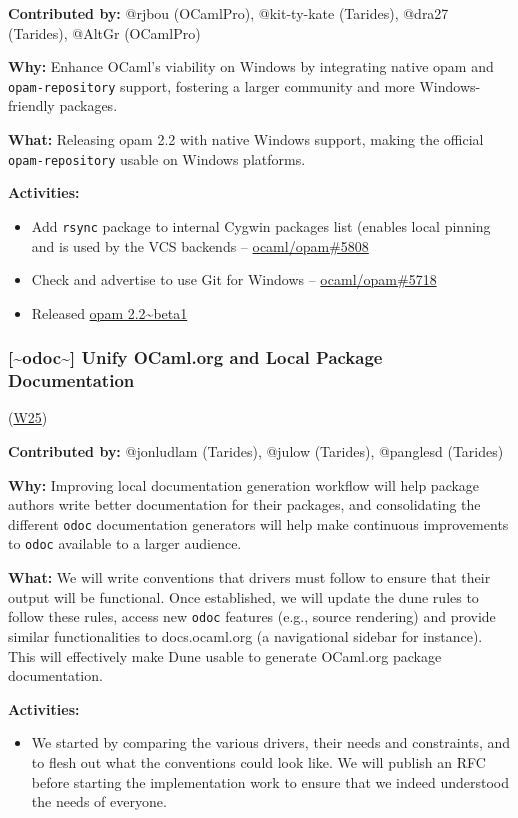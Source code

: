 \documentclass[11pt]{article}
\begin{document}
\textbf{Contributed by:} @rjbou (OCamlPro), @kit-ty-kate (Tarides), @dra27 (Tarides), @AltGr (OCamlPro)

\textbf{Why:} Enhance OCaml's viability on Windows by integrating native opam and \texttt{opam-repository} support, fostering a larger community
and more Windows-friendly packages.

\textbf{What:} Releasing opam 2.2 with native Windows support, making the official \texttt{opam-repository} usable on Windows platforms.

\textbf{Activities:}
\begin{itemize}
\item Add \texttt{rsync} package to internal Cygwin packages list (enables local pinning and is used by the VCS backends -- \href{https://github.com/ocaml/opam/pull/5808}{ocaml/opam\#5808}
\item Check and advertise to use Git for Windows -- \href{https://github.com/ocaml/opam/pull/5718}{ocaml/opam\#5718}
\item Released \href{https://ocaml.org/changelog/2024-01-18-opam-2-2-0-beta1}{opam 2.2\textasciitilde{}beta1}
\end{itemize}
\subsubsection*{\textbf{{[}\textasciitilde{}odoc\textasciitilde{}]} Unify OCaml.org and Local Package Documentation}
\label{sec:orgf3402ff}
(\href{https://ocaml.org/docs/platform-roadmap\#w25-generate-documentation}{W25})

\textbf{Contributed by:} @jonludlam (Tarides), @julow (Tarides), @panglesd (Tarides)

\textbf{Why:} Improving local documentation generation workflow will help package authors write better documentation for their packages,
and consolidating the different \texttt{odoc} documentation generators will help make continuous improvements to \texttt{odoc} available to a
larger audience.

\textbf{What:} We will write conventions that drivers must follow to ensure that their output will be functional. Once established, we
will update the dune rules to follow these rules, access new \texttt{odoc} features (e.g., source rendering) and provide similar
functionalities to docs.ocaml.org (a navigational sidebar for instance). This will effectively make Dune usable to generate OCaml.org
package documentation.

\textbf{Activities:}
\begin{itemize}
\item We started by comparing the various drivers, their needs and constraints, and to flesh out what the conventions could look like. We will publish an RFC before starting the implementation work to ensure that we indeed understood the needs of everyone.
\end{itemize}
\end{document}
